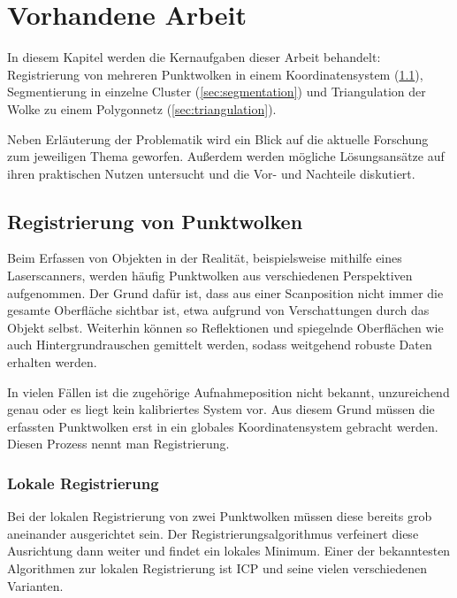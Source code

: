 
\chapter{Vorhandene Arbeit}
\label{ch:vorhandene-arbeit}

In diesem Kapitel werden die Kernaufgaben dieser Arbeit behandelt:
Registrierung von mehreren Punktwolken in einem Koordinatensystem (\ref{sec:registration}), Segmentierung in einzelne Cluster (\ref{sec:segmentation}) und Triangulation der Wolke zu einem Polygonnetz (\ref{sec:triangulation}).

Neben Erläuterung der Problematik wird ein Blick auf die aktuelle Forschung zum jeweiligen Thema geworfen.
Außerdem werden mögliche Lösungsansätze auf ihren praktischen Nutzen untersucht und die Vor- und Nachteile diskutiert.


\section{Registrierung von Punktwolken}
\label{sec:registration}

Beim Erfassen von Objekten in der Realität, beispielsweise mithilfe eines Laserscanners, werden häufig Punktwolken aus verschiedenen Perspektiven aufgenommen.
Der Grund dafür ist, dass aus einer Scanposition nicht immer die gesamte Oberfläche sichtbar ist, etwa aufgrund von Verschattungen durch das Objekt selbst.
Weiterhin können so Reflektionen und spiegelnde Oberflächen wie auch Hintergrundrauschen gemittelt werden, sodass weitgehend robuste Daten erhalten werden.

In vielen Fällen ist die zugehörige Aufnahmeposition nicht bekannt, unzureichend genau oder es liegt kein kalibriertes System vor.
Aus diesem Grund müssen die erfassten Punktwolken erst in ein globales Koordinatensystem gebracht werden.
Diesen Prozess nennt man Registrierung.


\subsection{Lokale Registrierung}
\label{subsec:local-registration}

Bei der lokalen Registrierung von zwei Punktwolken müssen diese bereits grob aneinander ausgerichtet sein.
Der Registrierungsalgorithmus verfeinert diese Ausrichtung dann weiter und findet ein lokales Minimum.
Einer der bekanntesten Algorithmen zur lokalen Registrierung ist \ac{ICP} und seine vielen verschiedenen Varianten.


